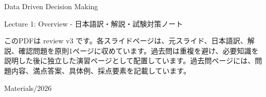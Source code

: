 \documentclass[a4paper,10pt]{article}
\begin{document}
\begin{titlepage}
\centering
\vspace*{2cm}
{\Huge Data Driven Decision Making\par}
\vspace{0.5cm}
{\Large Lecture 1: Overview - 日本語訳・解説・試験対策ノート\par}
\vspace{1cm}
\begin{minipage}{0.88\textwidth}
このPDFは review v3 です。各スライドページは、元スライド、日本語訳、解説、確認問題を原則1ページに収めています。過去問は重複を避け、必要知識を説明した後に独立した演習ページとして配置しています。過去問ページには、問題内容、満点答案、具体例、採点要素を記載しています。
\end{minipage}
\vfill
{\large Materials/2026}
\end{titlepage}
\tableofcontents
\clearpage

\end{document}
